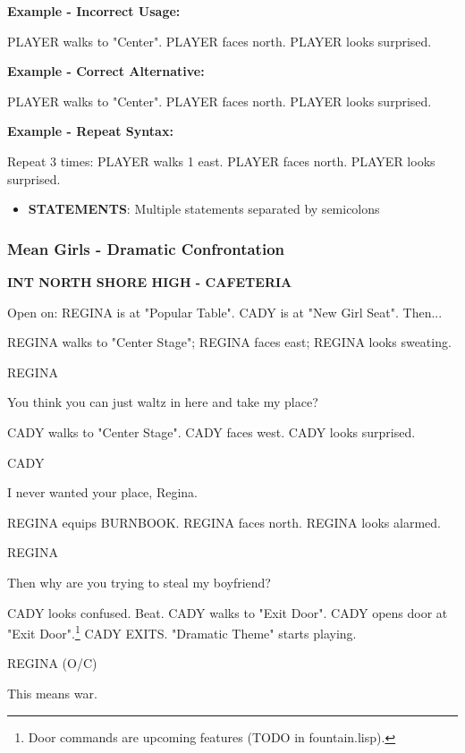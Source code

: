 \documentclass[11pt,letterpaper,oldstylefigures]{memoir}
\newcommand{\slugline}[1]{\nobreak\textbf{\MakeUppercase{#1}}\par\nobreak\vspace{1\baselineskip}}
\newcommand{\speaker}[1]{\nobreak\hspace*{0.333\textwidth}\MakeUppercase{#1}\par\nobreak\vspace{0.5\baselineskip}}
\newcommand{\dialogue}[1]{\nobreak\hspace*{0.25\textwidth}\begin{minipage}{0.5\textwidth}#1\end{minipage}\par\vspace{1\baselineskip}}
\newcommand{\stagedir}[1]{#1\par\vspace{1\baselineskip}}
\newenvironment{FountainExample}
  {\begingroup
  \ttfamily\small
   \setlength{\parindent}{0pt}
  \setlength{\parskip}{0.5em}
  \allowdisplaybreaks
  \setlength{\displaywidowpenalty}{0}
  \setlength{\widowpenalty}{0}
  \setlength{\clubpenalty}{0}
  \setlength{\interlinepenalty}{0}
}
  {\endgroup}
\newcommand{\fountain}[1]{\textbf{#1}}
\begin{document}
\textbf{Example - Incorrect Usage:}
\begin{FountainExample}
\stagedir{PLAYER walks to "Center". PLAYER faces north. PLAYER looks surprised.}
\end{FountainExample}

\textbf{Example - Correct Alternative:}
\begin{FountainExample}
\stagedir{PLAYER walks to "Center". PLAYER faces north. PLAYER looks surprised.}
\end{FountainExample}

\textbf{Example - Repeat Syntax:}
\begin{FountainExample}
\stagedir{Repeat 3 times: PLAYER walks 1 east. PLAYER faces north. PLAYER looks surprised.}
\end{FountainExample}

\begin{itemize}
\item \fountain{STATEMENTS}: Multiple statements separated by semicolons
\end{itemize}

\subsubsection*{Mean Girls - Dramatic Confrontation}
\label{ex:mean-girls-dramatic-confrontation}

\begin{FountainExample}
\slugline{INT NORTH SHORE HIGH - CAFETERIA}

\stagedir{Open on: REGINA is at "Popular Table". CADY is at "New Girl Seat". Then...}

\stagedir{REGINA walks to "Center Stage"; REGINA faces east; REGINA looks sweating.}

\speaker{REGINA}
\dialogue{You think you can just waltz in here and take my place?}

\stagedir{CADY walks to "Center Stage". CADY faces west. CADY looks surprised.}

\speaker{CADY}
\dialogue{I never wanted your place, Regina.}

\stagedir{REGINA equips BURNBOOK. REGINA faces north. REGINA looks alarmed.}

\speaker{REGINA}
\dialogue{Then why are you trying to steal my boyfriend?}

\stagedir{CADY looks confused. Beat. CADY walks to "Exit Door". CADY opens door at "Exit Door".\footnote{Door commands are upcoming features (TODO in fountain.lisp).} CADY EXITS. "Dramatic Theme" starts playing.}

\speaker{REGINA (O/C)}
\dialogue{This means war.}
\end{FountainExample}
\end{document}
